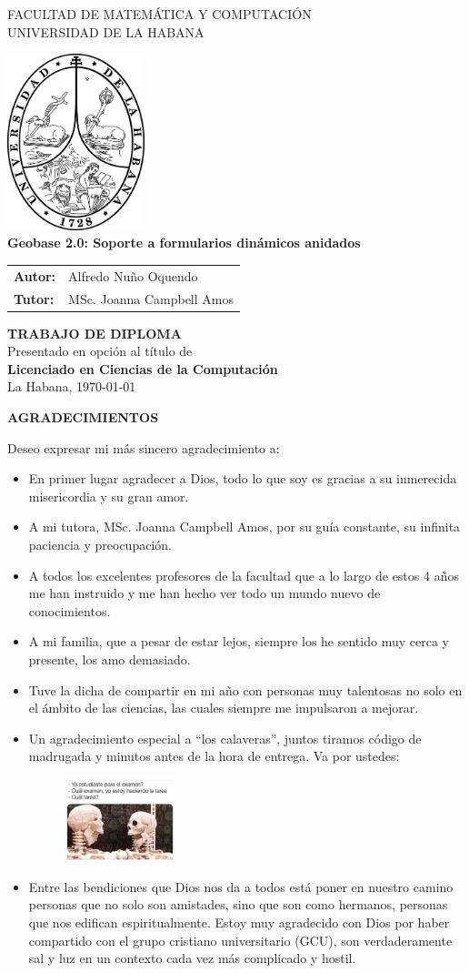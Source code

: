 \documentclass[12pt, a4paper]{book}
\date{}
\newcommand{\portada}[5]{
  \begin{titlepage}
    \begin{center}
      {\normalsize FACULTAD DE MATEMÁTICA Y COMPUTACIÓN} \\
      {\normalsize UNIVERSIDAD DE LA HABANA}
    \end{center}
    
    \vspace*{\fill} %
    
    \begin{center}
      \includegraphics[width=0.3\textwidth]{images/uhlogo.png} \\
      \vspace{2cm}
      {\LARGE \textbf{#1}} \\
    \end{center}
    
    \vspace*{2cm} %
    
    \begin{center}
       \begin{tabular}{l l}
        \textbf{Autor:} & #2 \\
        \textbf{Tutor:} & #3 \\
      \end{tabular}
      \vspace{2cm}
      
      \textbf{TRABAJO DE DIPLOMA} \\
      Presentado en opción al título de \\
      \textbf{#4} \\
      \vspace{1cm}
      #5 %
    \end{center}
  \end{titlepage}
}
\newenvironment{agradecimientos}{
  \clearpage %
  \thispagestyle{empty} %
  \begin{center}
    {\LARGE\bfseries AGRADECIMIENTOS} \\[1.5cm]
  \end{center}
  \setlength{\parindent}{0pt} %
  \setlength{\parskip}{1em} %
}{
  \vspace*{\fill} %
  \newpage %
}
\let\cleardoublepage\clearpage %
\begin{document}
\portada
  {Geobase 2.0: Soporte a formularios dinámicos anidados} %
  {Alfredo Nuño Oquendo}                %
  {MSc. Joanna Campbell Amos}           %
  {Licenciado en Ciencias de la Computación} %
  {La Habana, \today}                       %

\begin{agradecimientos}
  Deseo expresar mi más sincero agradecimiento a:
  
  \begin{itemize}
    \item En primer lugar agradecer a Dios, todo lo que soy es gracias a su inmerecida misericordia y su gran amor.
    \item A mi tutora, MSc. Joanna Campbell Amos, por su guía constante, su infinita paciencia y preocupación.
    \item A todos los excelentes profesores de la facultad que a lo largo de estos 4 años me han instruido y me han hecho ver todo un mundo nuevo de conocimientos.
    \item A mi familia, que a pesar de estar lejos, siempre los he sentido muy cerca y presente, los amo demasiado.
    \item Tuve la dicha de compartir en mi año con personas muy talentosas no solo en el ámbito de las ciencias, las cuales siempre me impulsaron a mejorar. 
    \item Un agradecimiento especial a ``los calaveras'', juntos tiramos código de madrugada y minutos antes de la hora de entrega. Va por ustedes:
    \begin{figure}[H]
      \centering
      \includegraphics[width=0.3\textwidth]{images/meme-calaveras.jpg}
      \label{fig:skull}
    \end{figure}
    \item Entre las bendiciones que Dios nos da a todos está poner en nuestro camino personas que no solo son amistades, sino que son como hermanos, personas que nos edifican espiritualmente. Estoy muy agradecido con Dios por haber compartido con el grupo cristiano universitario (GCU), son verdaderamente sal y luz en un contexto cada vez más complicado y hostil. 

\end{itemize}
\end{agradecimientos}
\end{document}
